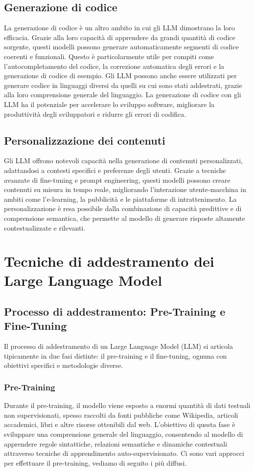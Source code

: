\documentclass[target=mst,aauheader=,style=]{thud}
\begin{document}
\subsection{Generazione di codice}
La generazione di codice è un altro ambito in cui gli LLM dimostrano la loro efficacia. Grazie alla loro capacità di apprendere da grandi quantità di codice sorgente, questi modelli possono generare automaticamente segmenti di codice coerenti e funzionali. Questo è particolarmente utile per compiti come l'autocompletamento del codice, la correzione automatica degli errori e la generazione di codice di esempio. Gli LLM possono anche essere utilizzati per generare codice in linguaggi diversi da quelli su cui sono stati addestrati, grazie alla loro comprensione generale del linguaggio. La generazione di codice con gli LLM ha il potenziale per accelerare lo sviluppo software, migliorare la produttività degli sviluppatori e ridurre gli errori di codifica.

\subsection{Personalizzazione dei contenuti}
Gli LLM offrono notevoli capacità nella generazione di contenuti personalizzati, adattandosi a contesti specifici e preferenze degli utenti. Grazie a tecniche avanzate di fine-tuning e prompt engineering, questi modelli possono creare contenuti su misura in tempo reale, migliorando l'interazione utente-macchina in ambiti come l'e-learning, la pubblicità e le piattaforme di intrattenimento. La personalizzazione è resa possibile dalla combinazione di capacità predittive e di comprensione semantica, che permette al modello di generare risposte altamente contestualizzate e rilevanti.


\section{Tecniche di addestramento dei Large Language Model}

\subsection{Processo di addestramento: Pre-Training e Fine-Tuning}
Il processo di addestramento di un Large Language Model (LLM) si articola tipicamente in due fasi distinte: il pre-training e il fine-tuning, ognuna con obiettivi specifici e metodologie diverse.

\subsubsection{Pre-Training}
Durante il pre-training, il modello viene esposto a enormi quantità di dati testuali non supervisionati, spesso raccolti da fonti pubbliche come Wikipedia, articoli accademici, libri e altre risorse ottenibili dal web. L’obiettivo di questa fase è sviluppare una comprensione generale del linguaggio, consentendo al modello di apprendere regole sintattiche, relazioni semantiche e dinamiche contestuali attraverso tecniche di apprendimento auto-supervisionato. Ci sono vari approcci per effettuare il pre-training, vediamo di seguito i più diffusi.\cite{hadi_2024}
\end{document}
